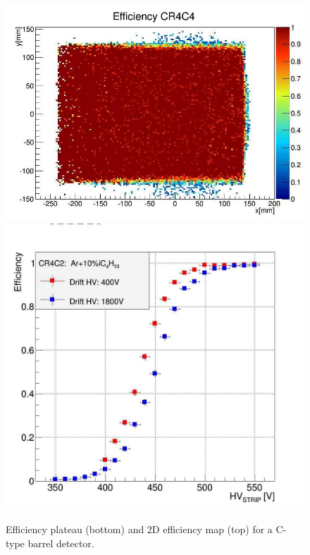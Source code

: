 \begin{figure}[htb]
 \includegraphics[width=1.0\columnwidth,keepaspectratio]{images/Eff_2D}
 \includegraphics[width=1.0\columnwidth,keepaspectratio]{images/Plateau_HV}
 \caption{Efficiency plateau (bottom) and 2D efficiency map (top) for a C-type barrel detector.}
 \label{fig:mm-fig8}
\end{figure}

